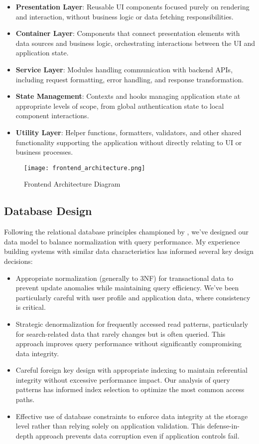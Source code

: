 \documentclass[12pt,a4paper]{article}
\begin{document}
\begin{itemize}
    \item \textbf{Presentation Layer}: Reusable UI components focused purely on rendering and interaction, without business logic or data fetching responsibilities.
    \item \textbf{Container Layer}: Components that connect presentation elements with data sources and business logic, orchestrating interactions between the UI and application state.
    \item \textbf{Service Layer}: Modules handling communication with backend APIs, including request formatting, error handling, and response transformation.
    \item \textbf{State Management}: Contexts and hooks managing application state at appropriate levels of scope, from global authentication state to local component interactions.
    \item \textbf{Utility Layer}: Helper functions, formatters, validators, and other shared functionality supporting the application without directly relating to UI or business processes.
\end{itemize}

\begin{figure}[H]
\centering
\texttt{[image: frontend\_architecture.png]}
\caption{Frontend Architecture Diagram}
\label{fig:frontend-architecture}
\end{figure}

\subsection{Database Design}

Following the relational database principles championed by \citet{grinberg2018}, we've designed our data model to balance normalization with query performance. My experience building systems with similar data characteristics has informed several key design decisions:

\begin{itemize}
    \item Appropriate normalization (generally to 3NF) for transactional data to prevent update anomalies while maintaining query efficiency. We've been particularly careful with user profile and application data, where consistency is critical.
    \item Strategic denormalization for frequently accessed read patterns, particularly for search-related data that rarely changes but is often queried. This approach improves query performance without significantly compromising data integrity.
    \item Careful foreign key design with appropriate indexing to maintain referential integrity without excessive performance impact. Our analysis of query patterns has informed index selection to optimize the most common access paths.
    \item Effective use of database constraints to enforce data integrity at the storage level rather than relying solely on application validation. This defense-in-depth approach prevents data corruption even if application controls fail.
\end{itemize}
\end{document}
